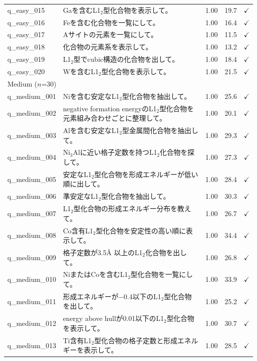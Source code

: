 \begin{longtable}{lp{8.1cm}ccl}
    q\_easy\_015 & Gaを含むL1$_2$型化合物を表示して。 & 1.00 & 19.7 & $\checkmark$ \\
    q\_easy\_016 & Feを含む化合物を一覧にして。 & 1.00 & 16.4 & $\checkmark$ \\
    q\_easy\_017 & Aサイトの元素を一覧にして。 & 1.00 & 11.5 & $\checkmark$ \\
    q\_easy\_018 & 化合物の元素系を表示して。 & 1.00 & 13.2 & $\checkmark$ \\
    q\_easy\_019 & L1$_2$型でcubic構造の化合物を出して。 & 1.00 & 18.4 & $\checkmark$ \\
    q\_easy\_020 & Wを含むL1$_2$型化合物を表示して。 & 1.00 & 21.5 & $\checkmark$ \\
    \midrule
    \multicolumn{5}{l}{Medium ($n$=30)} \\
    \midrule
    q\_medium\_001 & Niを含む安定なL1$_2$型化合物を抽出して。 & 1.00 & 25.6 & $\checkmark$ \\
    q\_medium\_002 & negative formation energyのL1$_2$型化合物を元素組み合わせごとに整理して。 & 1.00 & 20.1 & $\checkmark$ \\
    q\_medium\_003 & Alを含む安定なL1$_2$型金属間化合物を抽出して。 & 1.00 & 29.3 & $\checkmark$ \\
    q\_medium\_004 & Ni$_3$Alに近い格子定数を持つL1$_2$化合物を探して。 & 1.00 & 27.3 & $\checkmark$ \\
    q\_medium\_005 & 安定なL1$_2$型化合物を形成エネルギーが低い順に出して。 & 1.00 & 28.4 & $\checkmark$ \\
    q\_medium\_006 & 準安定なL1$_2$型化合物を抽出して。 & 1.00 & 30.3 & $\checkmark$ \\
    q\_medium\_007 & L1$_2$型化合物の形成エネルギー分布を教えて。 & 1.00 & 26.7 & $\checkmark$ \\
    q\_medium\_008 & Co含有L1$_2$型化合物を安定性の高い順に表示して。 & 1.00 & 34.4 & $\checkmark$ \\
    q\_medium\_009 & 格子定数が3.5\AA{}{} 以上のL1$_2$化合物を出して。 & 1.00 & 26.8 & $\checkmark$ \\
    q\_medium\_010 & NiまたはCoを含むL1$_2$型化合物を一覧にして。 & 1.00 & 33.9 & $\checkmark$ \\
    q\_medium\_011 & 形成エネルギーが$-$0.4以下のL1$_2$型化合物を出して。 & 1.00 & 25.2 & $\checkmark$ \\
    q\_medium\_012 & energy above hullが0.01以下のL1$_2$型化合物を表示して。 & 1.00 & 30.7 & $\checkmark$ \\
    q\_medium\_013 & Ti含有L1$_2$型化合物の格子定数と形成エネルギーを表示して。 & 1.00 & 28.5 & $\checkmark$ \\

\end{longtable}
